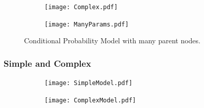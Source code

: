 \documentclass{beamer}
\begin{document}
\begin{frame}
\begin{figure}
        \centering
        \begin{subfigure}[b]{0.3\textwidth}
                \texttt{[image: Complex.pdf]}
                
        \end{subfigure}%
       \begin{subfigure}[b]{0.7\textwidth}
        \texttt{[image: ManyParams.pdf]}
        \end{subfigure}%
                \caption{Conditional Probability Model with many parent nodes.} 
\end{figure}
\end{frame}

\begin{frame}
\frametitle{Simple and Complex}
\begin{figure}
        \centering
       \begin{subfigure}{0.4\textwidth}
        \texttt{[image: SimpleModel.pdf]}
                         \end{subfigure}
\begin{subfigure}{0.4\textwidth}
        \texttt{[image: ComplexModel.pdf]}
        \end{subfigure}%

\end{figure}
\end{frame}
\end{document}
